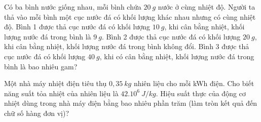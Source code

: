\begin{ex}%
	Có ba bình nước giống nhau, mỗi bình chứa $20\ g$ nước ở cùng nhiệt độ. Người ta thả vào mỗi bình một cục nước đá có khối lượng khác nhau nhưng có cùng nhiệt độ. Bình 1 được thả cục nước đá có khối lượng $10\ g$, khi cân bằng nhiệt, khối lượng nước đá trong bình là $9\ g$. Bình 2 được thả cục nước đá có khối lượng $20\ g$, khi cân bằng nhiệt, khối lượng nước đá trong bình không đổi. Bình 3 được thả cục nước đá có khối lượng $40\ g$, khi có cân bằng nhiệt, khối lượng nước đá trong bình là bao nhiêu gam?
\end{ex}

\begin{ex}%
	Một nhà máy nhiệt điện tiêu thụ $0,35\ kg$ nhiên liệu cho mỗi kWh điện. Cho biết năng suất tỏa nhiệt của nhiên liệu là $42.10^6\ J/kg$. Hiệu suất thực của động cơ nhiệt dùng trong nhà máy điện bằng bao nhiêu phần trăm (làm tròn kết quả đến chữ số hàng đơn vị)?	
\end{ex}

